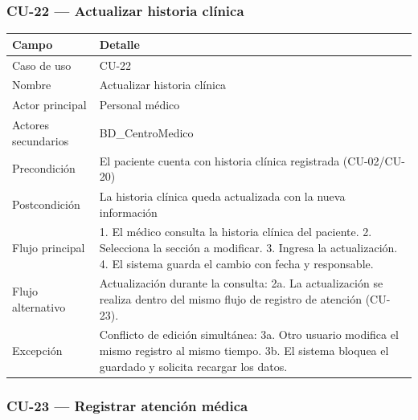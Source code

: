 \documentclass[11pt,a4paper]{article}
\begin{document}
	\subsubsection{CU-22 --- Actualizar historia clínica}
	
	\begin{longtable}{p{} p{} }
		\toprule
		\textbf{Campo} & \textbf{Detalle} \\
		\midrule
		\endhead
		Caso de uso & CU-22 \\
		Nombre & Actualizar historia clínica \\
		Actor principal & Personal médico \\
		Actores secundarios & BD\_CentroMedico \\
		Precondición & El paciente cuenta con historia clínica registrada (CU-02/CU-20) \\
		Postcondición & La historia clínica queda actualizada con la nueva información \\
		Flujo principal & 1. El médico consulta la historia clínica del paciente. 2. Selecciona la sección a modificar. 3. Ingresa la actualización. 4. El sistema guarda el cambio con fecha y responsable. \\
		Flujo alternativo & Actualización durante la consulta: 2a. La actualización se realiza dentro del mismo flujo de registro de atención (CU-23). \\
		Excepción & Conflicto de edición simultánea: 3a. Otro usuario modifica el mismo registro al mismo tiempo. 3b. El sistema bloquea el guardado y solicita recargar los datos. \\
		\bottomrule
	\end{longtable}
	
	\subsubsection{CU-23 --- Registrar atención médica}
	
\end{document}
